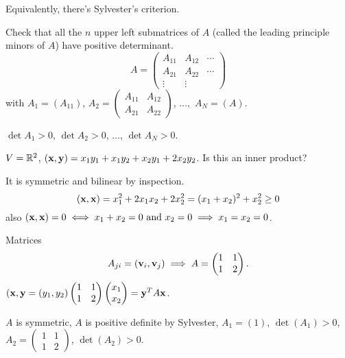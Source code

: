 \documentclass[10pt, a4paper]{article}
\begin{document}
Equivalently,
there's Sylvester's criterion.

Check that all the $n$ upper left submatrices of $A$
(called the leading principle minors of $A$)
have positive determinant.
\[
A = \begin{pmatrix}
    A_{11} & A_{12} & \dotsi \\
    A_{21} & A_{22} & \dotsi \\
    \vdots & \vdots &
\end{pmatrix}
\]
with $A_1 = (A_{11})$,
$A_2 = \begin{pmatrix}
    A_{11} & A_{12} \\
    A_{21} & A_{22}
\end{pmatrix}$,
$\dotsc,$
$A_N = (A)$.

$\det{A_1} > 0$,
$\det{A_2} > 0$,
$\dotsc$,
$\det{A_N} > 0$.


\begin{example}
    $V = \mathbb{R} ^ 2$,
    $(\mathbf{x}, \mathbf{y}) = x_1y_1 + x_1y_2 + x_2y_1 + 2x_2y_2$.
    Is this an inner product?

    \begin{solution}
        It is symmetric and bilinear by inspection.
        \[
        (\mathbf{x}, \mathbf{x}) = x_1 ^ 2 + 2x_1x_2 + 2x_2 ^ 2 = (x_1 + x_2) ^ 2 + x_2 ^ 2 \geq 0
        \]
        also $(\mathbf{x}, \mathbf{x}) = 0 \iff x_1 + x_2 = 0 \text{ and } x_2 = 0 \implies x_1 = x_2 = 0$.

        Matrices
        \[
        A_{ji} = (\mathbf{v}_i, \mathbf{v}_j) \implies A = \begin{pmatrix}
            1 & 1 \\ 1 & 2
        \end{pmatrix}.
        \]
        $(\mathbf{x}, \mathbf{y} = (y_1, y_2)\begin{pmatrix}
            1 & 1 \\ 1 & 2
        \end{pmatrix}\begin{pmatrix}
            x_1 \\ x_2
        \end{pmatrix} = \mathbf{y} ^ TA\mathbf{x}$.

        $A$ is symmetric,
        $A$ is positive definite by Sylvester,
        $A_1 = (1)$,
        $\det(A_1) > 0$,
        $A_2 = \begin{pmatrix}
            1 & 1 \\ 1 & 2
        \end{pmatrix}$,
        $\det(A_2) > 0$.
    \end{solution}
\end{example}
\end{document}
